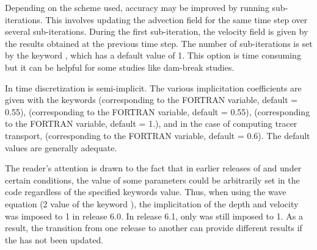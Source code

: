 Depending on the scheme used, accuracy may be improved by running sub-iterations.
This involves updating the advection field for the same time step over several
sub-iterations.
During the first sub-iteration, the velocity field is given by the results
obtained at the previous time step.
The number of sub-iterations is set by the keyword
,
which has a default value of 1.
This option is time consuming but it can be helpful for some studies
like dam-break studies.

In  time discretization is semi-implicit.
The various implicitation coefficients are given with the keywords
(corresponding to the  FORTRAN variable, default = 0.55),
(corresponding to the  FORTRAN variable, default = 0.55),
(corresponding to the  FORTRAN variable, default = 1.),
and in the case of computing tracer transport,
(corresponding to the  FORTRAN variable, default = 0.6).
The default values are generally adequate.

The reader's attention is drawn to the fact that in earlier releases of
 and under certain conditions,
the value of some parameters could be arbitrarily set in the code regardless
of the specified keywords value.
Thus, when using the wave equation (2 value of the keyword
), the implicitation of the depth and
velocity was imposed to 1 in release 6.0.
In release 6.1, only  was still imposed to 1.
As a result, the transition from one release to another can provide
different results if the  has not been updated.


